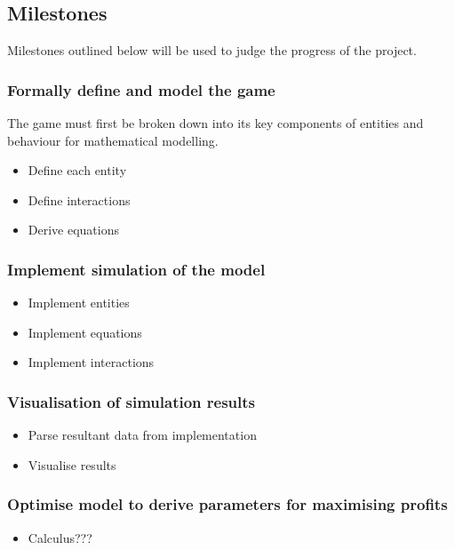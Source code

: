 \subsection{Milestones}

Milestones outlined below will be used to judge the progress of the project. 

\subsubsection{Formally define and model the game}

The game must first be broken down into its key components of entities and behaviour for mathematical modelling. 

\begin{itemize}
  \item Define each entity
  \item Define interactions
  \item Derive equations
\end{itemize}

\subsubsection{Implement simulation of the model}

\begin{itemize}
  \item Implement entities
  \item Implement equations
  \item Implement interactions
\end{itemize}

\subsubsection{Visualisation of simulation results}

\begin{itemize}
  \item Parse resultant data from implementation
  \item Visualise results
\end{itemize}

\subsubsection{Optimise model to derive parameters for maximising profits}

\begin{itemize}
  \item Calculus???
\end{itemize}

